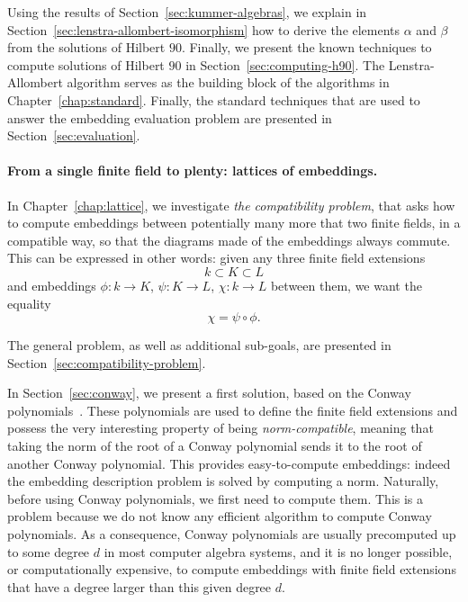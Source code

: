 Using the results of Section~\ref{sec:kummer-algebras}, we explain in
Section~\ref{sec:lenstra-allombert-isomorphism} how to derive the elements
$\alpha$ and $\beta$ from the solutions of Hilbert $90$. Finally, we
present the known techniques to compute solutions of Hilbert $90$ in
Section~\ref{sec:computing-h90}. The Lenstra-Allombert algorithm serves as the
building block of the algorithms in Chapter~\ref{chap:standard}. Finally, the
standard techniques that are used to answer the embedding evaluation problem are
presented in Section~\ref{sec:evaluation}.

\paragraph{From a single finite field to plenty: lattices of embeddings.}
In Chapter~\ref{chap:lattice}, we investigate \emph{the compatibility problem},
that asks how to compute embeddings between potentially many more that two
finite fields, in a compatible way, \ie so that the diagrams made of the embeddings
always commute. This can be expressed in other words: given any three finite
field extensions 
\[
  k \subset K\subset L
\]
and embeddings $\phi:k\to K$, $\psi:K\to L$, $\chi:k\to L$ between them, we want
the equality
\[
  \chi=\psi\circ\phi.
\]
\begin{center}
\end{center}
The general problem, as well as additional sub-goals, are presented in
Section~\ref{sec:compatibility-problem}.

In Section~\ref{sec:conway}, we present a first solution, based on the Conway
polynomials~\cite{Parker90, Scheerhorn92}. These polynomials are used to define
the finite field extensions and possess the very interesting property of being
\emph{norm-compatible}, meaning that taking the norm of the root of a Conway
polynomial sends it to the root of another Conway polynomial. This provides
easy-to-compute embeddings: indeed the embedding description problem is solved
by computing a norm. Naturally, before using Conway polynomials, we first need
to compute them. This is a problem because we do not know any efficient
algorithm to compute Conway polynomials. As a consequence, Conway polynomials
are usually precomputed up to some degree $d$ in most computer algebra systems,
and it is no longer possible, or computationally expensive, to compute embeddings
with finite field extensions that have a degree larger than this given degree
$d$.

